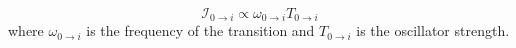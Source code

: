 %
%

\begin{equation}
    \mathscr{I}_{0 \rightarrow i} \propto \omega_{0 \rightarrow i} T_{0 \rightarrow i}
\label{eq:spec_eqs}
\end{equation}
where $\omega_{0 \rightarrow i}$ is the frequency of the transition and $T_{0 \rightarrow i}$ is the oscillator strength.

%
